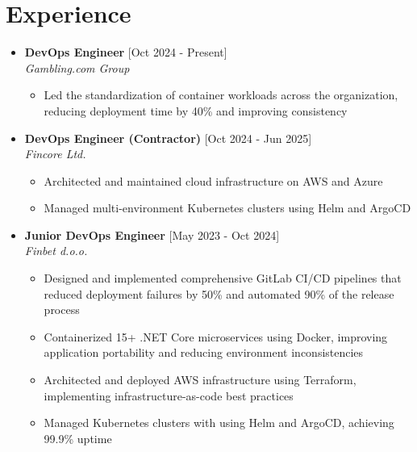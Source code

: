 \documentclass[12pt,a4paper]{moderncv}
\begin{document}
\makecvtitle

\vspace{-0.8em}
\section{Experience}

\begin{itemize}
	\item \textbf{DevOps Engineer} \hfill [Oct 2024 - Present]\\
	\textit{Gambling.com Group}

	\begin{itemize}
		\vspace{-0.75em}
		\setlength\itemsep{0.1em}
		\item Led the standardization of container workloads across the organization, reducing deployment time by 40\% and improving consistency
	\end{itemize}

	\item \textbf{DevOps Engineer (Contractor)} \hfill [Oct 2024 - Jun 2025]\\
	\textit{Fincore Ltd.}

	\begin{itemize}
		\vspace{-0.75em}
		\setlength\itemsep{0.1em}
		\item Architected and maintained cloud infrastructure on AWS and Azure
		\item Managed multi-environment Kubernetes clusters using Helm and ArgoCD
	\end{itemize}

	\item \textbf{Junior DevOps Engineer} \hfill [May 2023 - Oct 2024]\\
	\textit{Finbet d.o.o.}

	\begin{itemize}
		\vspace{-0.75em}
		\setlength\itemsep{0.1em}
		\item Designed and implemented comprehensive GitLab CI/CD pipelines that reduced deployment failures by 50\% and automated 90\% of the release process
		\item Containerized 15+ .NET Core microservices using Docker, improving application portability and reducing environment inconsistencies
		\item Architected and deployed AWS infrastructure using Terraform, implementing infrastructure-as-code best practices
		\item Managed Kubernetes clusters with using Helm and ArgoCD, achieving 99.9\% uptime
	\end{itemize}

\end{itemize}	
\end{document}
